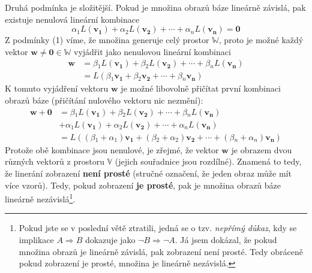 \documentclass[a5paper,12pt]{amsbook}
\theoremstyle{definition}
\newcommand{\myscalar}[1]{#1}
\newcommand{\myvec}[1]{\bm{#1}}
\newcommand{\myspace}[1]{\mathbb{#1}}
\newcommand{\mymap}[1]{#1}
\begin{document}
Druhá podmínka je složitější. Pokud je množina obrazů báze lineárně závislá, pak existuje
nenulová lineární kombinace
\begin{equation*}
\myscalar{\alpha{}_1}\mymap{L}(\myvec{v_1}) + \myscalar{\alpha{}_2}\mymap{L}(\myvec{v_2}) 
  + \cdots + \myscalar{\alpha{}_n}\mymap{L}(\myvec{v_n}) = \myvec{0}
\end{equation*}
 Z podmínky (1) víme, že množina generuje celý prostor $\myspace{W}$, proto je
možné každý vektor $\myvec{w}\neq\myvec{0}\in\myspace{W}$ vyjádřit jako nenulovou lineární kombinaci
\begin{equation*}
\begin{split}
\myvec{w} &= \myscalar{\beta{}_1}\mymap{L}(\myvec{v_1}) + \myscalar{\beta{}_2}\mymap{L}(\myvec{v_2}) 
  + \cdots + \myscalar{\beta{}_n}\mymap{L}(\myvec{v_n}) \\
&= \mymap{L}(\myscalar{\beta{}_1}\myvec{v_1} + \myscalar{\beta{}_2}\myvec{v_2} 
  + \cdots + \myscalar{\beta{}_n}\myvec{v_n})
\end{split}
\end{equation*}
K tomuto vyjádření vektoru $\myvec{w}$ je možné libovolně přičítat první kombinaci obrazů báze
(přičítání nulového vektoru nic nezmění):
\begin{equation*}
\begin{split}
\myvec{w} + \myvec{0} &= \myscalar{\beta{}_1}\mymap{L}(\myvec{v_1}) 
  + \myscalar{\beta{}_2}\mymap{L}(\myvec{v_2}) + \cdots + \myscalar{\beta{}_n}\mymap{L}(\myvec{v_n}) \\
  &+ \myscalar{\alpha{}_1}\mymap{L}(\myvec{v_1}) + \myscalar{\alpha{}_2}\mymap{L}(\myvec{v_2}) 
  + \cdots + \myscalar{\alpha{}_n}\mymap{L}(\myvec{v_n}) \\
&= \mymap{L}((\myscalar{\beta{}_1} + \myscalar{\alpha{}_1})\myvec{v_1} 
  + (\myscalar{\beta{}_2} + \myscalar{\alpha{}_2})\myvec{v_2} 
  + \cdots + (\myscalar{\beta{}_n} + \myscalar{\alpha{}_n})\myvec{v_n})
\end{split}
\end{equation*}
Protože obě kombinace jsou nenulové, je zřejmé, že vektor $\myvec{w}$ je obrazem dvou různých
vektorů z prostoru $\myspace{V}$ (jejich souřadnice jsou rozdílné). Znamená to tedy, že
linerání zobrazení \textbf{není prosté} (stručné označení, že jeden obraz může mít více vzorů).
Tedy, pokud zobrazení \textbf{je prosté}, pak je množina obrazů báze lineárně nezávislá\footnote{
  Pokud jste se v poslední větě ztratili, jedná se o tzv. \textit{nepřímý důkaz}, kdy se
  implikace $A\Rightarrow B$ dokazuje jako $\lnot B\Rightarrow\lnot A$. Já jsem dokázal, že pokud
  množina obrazů je lineárně závislá, pak zobrazení není prosté. Tedy obráceně pokud zobrazení
  je prosté, množina je lineárně nezávislá.
}.
\end{document}
